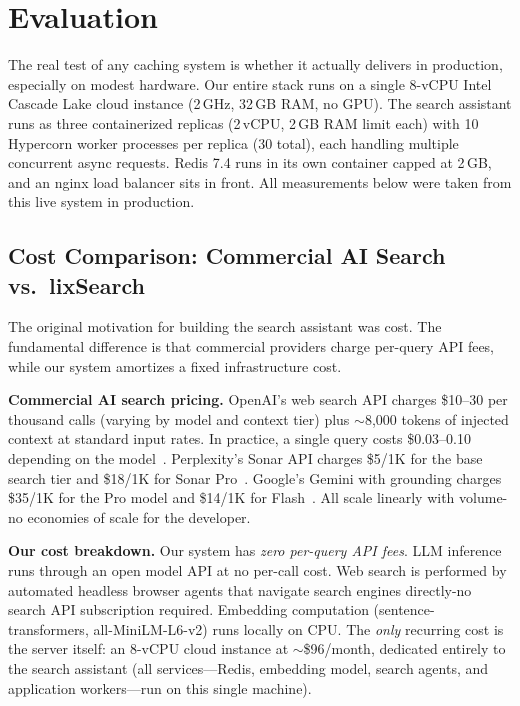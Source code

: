 \documentclass[conference]{IEEEtran}
\begin{document}
\section{Evaluation}
\label{sec:evaluation}

The real test of any caching system is whether it actually delivers in production, especially on modest hardware. Our entire stack runs on a single 8-vCPU Intel Cascade Lake cloud instance (2\,GHz, 32\,GB RAM, no GPU). The search assistant runs as three containerized replicas (2\,vCPU, 2\,GB RAM limit each) with 10 Hypercorn worker processes per replica (30 total), each handling multiple concurrent async requests. Redis 7.4 runs in its own container capped at 2\,GB, and an nginx load balancer sits in front. All measurements below were taken from this live system in production.

\subsection{Cost Comparison: Commercial AI Search vs.\ lixSearch}

The original motivation for building the search assistant was cost. The fundamental difference is that commercial providers charge per-query API fees, while our system amortizes a fixed infrastructure cost.

\textbf{Commercial AI search pricing.} OpenAI's web search API charges \$10--30 per thousand calls (varying by model and context tier) plus ${\sim}$8{,}000 tokens of injected context at standard input rates. In practice, a single query costs \$0.03--0.10 depending on the model~\cite{openai_search_pricing, openai_search_billing}. Perplexity's Sonar API charges \$5/1K for the base search tier and \$18/1K for Sonar Pro~\cite{perplexity_pricing}. Google's Gemini with grounding charges \$35/1K for the Pro model and \$14/1K for Flash~\cite{google_grounding_pricing}. All scale linearly with volume-no economies of scale for the developer.

\textbf{Our cost breakdown.} Our system has \emph{zero per-query API fees}. LLM inference runs through an open model API at no per-call cost. Web search is performed by automated headless browser agents that navigate search engines directly-no search API subscription required. Embedding computation (sentence-transformers, all-MiniLM-L6-v2) runs locally on CPU. The \emph{only} recurring cost is the server itself: an 8-vCPU cloud instance at ${\sim}$\$96/month, dedicated entirely to the search assistant (all services---Redis, embedding model, search agents, and application workers---run on this single machine).
\end{document}
